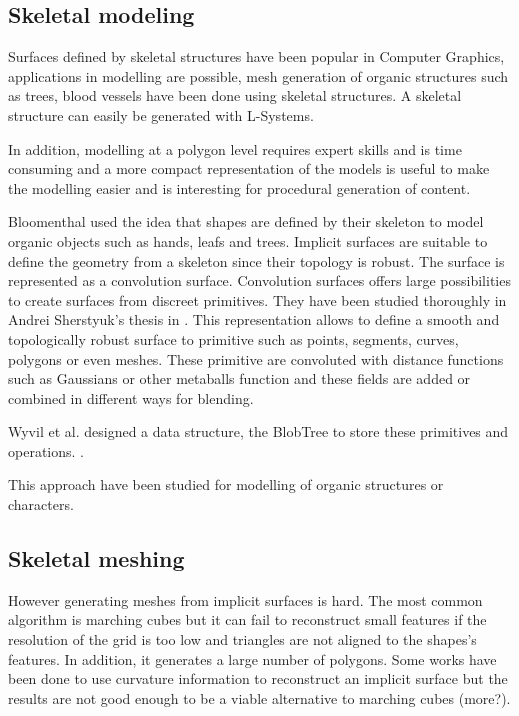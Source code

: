 \documentclass[11pt]{article}
\numberwithin{figure}{section}
\begin{document}
\maketitle

\subsection{Skeletal modeling}
Surfaces defined by skeletal structures have been popular in Computer Graphics, applications in modelling are possible, mesh generation of organic structures such as trees, blood vessels have been done using skeletal structures. A skeletal structure can easily be generated with L-Systems.

In addition, modelling at a polygon level requires expert skills and is time consuming and a more compact representation of the models is useful to make the modelling easier and is interesting for procedural generation of content.

Bloomenthal \cite{Bloomenthal:1996:SDN:238973} used the idea that shapes are defined by their skeleton to model organic objects such as hands, leafs and trees. 
Implicit surfaces are suitable to define the geometry from a skeleton since their topology is robust.
The surface is represented as a convolution surface. Convolution surfaces offers large possibilities to create surfaces from discreet primitives. They have been studied thoroughly in Andrei Sherstyuk's thesis in \cite{Sherstyuk}.
This representation allows to define a smooth and topologically robust surface to primitive such as points, segments, curves, polygons or even meshes. These primitive are convoluted with distance functions such as Gaussians or other metaballs function and these fields are added or combined in different ways for blending. 

Wyvil et al. designed a data structure, the BlobTree to store these primitives and operations. \cite{Wyvill:98a}.

This approach have been studied for modelling of organic structures or characters.

\subsection{Skeletal meshing}
However generating meshes from implicit surfaces is hard. The most common algorithm is marching cubes \cite{Lorensen:1987:MCH:37402.37422} but it can fail to reconstruct small features if the resolution of the grid is too low and triangles are not aligned to the shapes's features. In addition, it generates a large number of polygons.
Some works have been done to use curvature information to reconstruct an implicit surface \cite{Araujo:2004:CDP:1025131.1026262} but the results are not good enough to be a viable alternative to marching cubes (more?).
\end{document}
